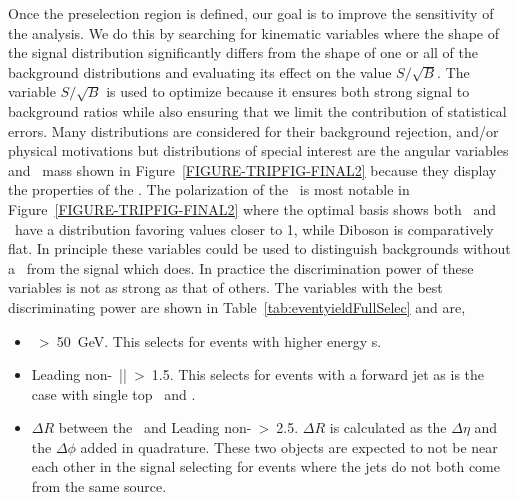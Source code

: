 Once the preselection region is defined, our goal is to improve the sensitivity of the analysis. We do this by searching for kinematic variables where the shape of the signal distribution significantly differs from the shape of one or all of the background distributions and evaluating its effect on the value $S/\sqrt{B}$. The variable $S/\sqrt{B}$ is used to optimize because it ensures both strong signal to background ratios while also ensuring that we limit the contribution of statistical errors. Many distributions are considered for their background rejection, and/or physical motivations but distributions of special interest are the angular variables and \athyph~mass shown in Figure~\ref{FIGURE-TRIPFIG-FINAL2} because they display the properties of the \at. The polarization of the \at~is most notable in Figure~\ref{FIGURE-TRIPFIG-FINAL2} where the optimal basis shows both \TTB~and \tz~have a distribution favoring values closer to 1, while Diboson is comparatively flat. In principle these variables could be used to distinguish backgrounds without a \at~from the signal which does. In practice the discrimination power of these variables is not as strong as that of others. The variables with the best discriminating power are shown in Table~\ref{tab:eventyieldFullSelec} and are, 

\begin{itemize}

\item \wtm~\textgreater~50~GeV. This selects for events with higher energy \aw s. 

\item Leading non-\bjet~|\eta|~\textgreater~1.5. This selects for events with a forward jet as is the case with single top \tchan~and \tz.

\item $\Delta R$ between the \bjet~and Leading non-\bjet~\textgreater~2.5. $\Delta R$ is calculated as the $\Delta \eta$ and the $\Delta \phi$ added in quadrature. These two objects are expected to not be near each other in the signal selecting for events where the jets do not both come from the same source.

\end{itemize}

